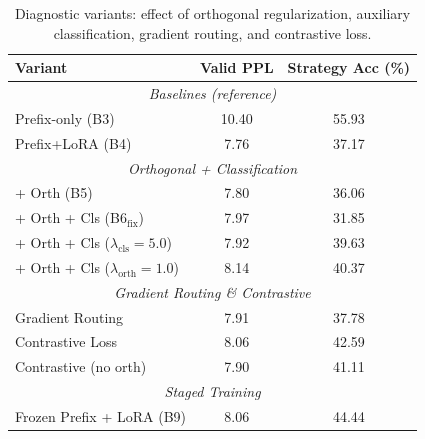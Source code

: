 \begin{table}[t]
\centering
\caption{Diagnostic variants: effect of orthogonal regularization, auxiliary classification,
         gradient routing, and contrastive loss.}
\label{tab:diag}
\begin{tabular}{lcc}
\toprule
\textbf{Variant} & \textbf{Valid PPL} & \textbf{Strategy Acc (\%)} \\
\midrule
\multicolumn{3}{c}{\textit{Baselines (reference)}} \\
\quad Prefix-only (B3)        & 10.40 & 55.93 \\
\quad Prefix+LoRA (B4)        & 7.76  & 37.17 \\
\midrule
\multicolumn{3}{c}{\textit{Orthogonal + Classification}} \\
\quad + Orth (B5)             & 7.80  & 36.06 \\
\quad + Orth + Cls (B6$_{\text{fix}}$) & 7.97 & 31.85 \\
\quad + Orth + Cls ($\lambda_{\text{cls}}{=}5.0$) & 7.92 & 39.63 \\
\quad + Orth + Cls ($\lambda_{\text{orth}}{=}1.0$) & 8.14 & 40.37 \\
\midrule
\multicolumn{3}{c}{\textit{Gradient Routing \& Contrastive}} \\
\quad Gradient Routing        & 7.91  & 37.78 \\
\quad Contrastive Loss        & 8.06  & 42.59 \\
\quad Contrastive (no orth)   & 7.90  & 41.11 \\
\midrule
\multicolumn{3}{c}{\textit{Staged Training}} \\
\quad Frozen Prefix + LoRA (B9) & 8.06 & 44.44 \\
\bottomrule
\end{tabular}
\end{table}


